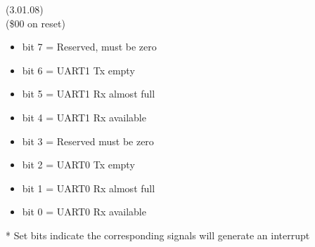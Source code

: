  (3.01.08)\\
(\$00 on reset)
\begin{itemize}
\item bit 7 = Reserved, must be zero
\item bit 6 = UART1 Tx empty
\item bit 5 = UART1 Rx almost full
\item bit 4 = UART1 Rx available
\item bit 3 = Reserved must be zero
\item bit 2 = UART0 Tx empty
\item bit 1 = UART0 Rx almost full
\item bit 0 = UART0 Rx available
\end{itemize}
* Set bits indicate the corresponding signals will generate an interrupt

